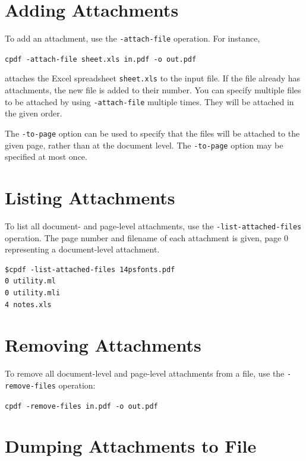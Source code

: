 \documentclass{book}
\begin{document}
  \section{Adding Attachments}
  To add an attachment, use the \texttt{-attach-file} operation. For instance,
  \begin{framed}
  \noindent\small\verb!cpdf -attach-file sheet.xls in.pdf -o out.pdf!
  \end{framed}
  \noindent attaches the Excel spreadsheet \texttt{sheet.xls} to the input file. If the file already has attachments, the new file is added to their number. You can specify multiple files to be attached by using \verb!-attach-file! multiple times. They will be attached in the given order.
  
  The \texttt{-to-page} option can be used to specify that the files will be attached to the given page, rather than at the document level. The \texttt{-to-page} option may be specified at most once. 

\section{Listing Attachments}
To list all document- and page-level attachments, use the \texttt{-list-attached-files} operation. The page number and filename of each attachment is given, page 0 representing a document-level attachment.
\begin{framed}
{\small\begin{verbatim}
$cpdf -list-attached-files 14psfonts.pdf
0 utility.ml
0 utility.mli
4 notes.xls
\end{verbatim}}
\end{framed}

  \section{Removing Attachments}
   To remove all document-level and page-level attachments from a file, use the \texttt{-remove-files} operation:
  \begin{framed}
    \noindent\small\verb!cpdf -remove-files in.pdf -o out.pdf!
  \end{framed}

\section{Dumping Attachments to File}
\end{document}
